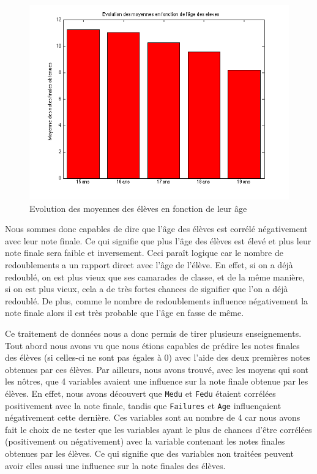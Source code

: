 \documentclass[11pt]{article}
\begin{document}
\begin{figure}[h]
\centering
\includegraphics[scale=0.8]{Images/fig45.png}
\caption{Evolution des moyennes des élèves en fonction de leur âge}
\end{figure}\FloatBarrier

Nous sommes donc capables de dire que l'âge des élèves est corrélé négativement avec leur note finale. Ce qui signifie que plus l'âge des élèves est élevé et plus leur note finale sera faible et inversement. Ceci paraît logique car le nombre de redoublements a un rapport direct avec l'âge de l'élève. En effet, si on a déjà redoublé, on est plus vieux que ses camarades de classe, et de la même manière, si on est plus vieux, cela a de très fortes chances de signifier que l'on a déjà redoublé. De plus, comme le nombre de redoublements influence négativement la note finale alors il est très probable que l'âge en fasse de même.

Ce traitement de données nous a donc permis de tirer plusieurs enseignements. Tout abord nous avons vu que nous étions capables de prédire les notes finales des élèves (si celles-ci ne sont pas égales à 0) avec l'aide des deux premières notes obtenues par ces élèves. Par ailleurs, nous avons trouvé, avec les moyens qui sont les nôtres, que 4 variables avaient une influence sur la note finale obtenue par les élèves. En effet, nous avons découvert que \texttt{Medu} et \texttt{Fedu} étaient corrélées positivement avec la note finale, tandis que \texttt{Failures} et \texttt{Age} influençaient négativement cette dernière. Ces variables sont au nombre de 4 car nous avons fait le choix de ne tester que les variables ayant le plus de chances d'être corrélées (positivement ou négativement) avec la variable contenant les notes finales obtenues par les élèves. Ce qui signifie que des variables non traitées peuvent avoir elles aussi une influence sur la note finales des élèves.
\end{document}
